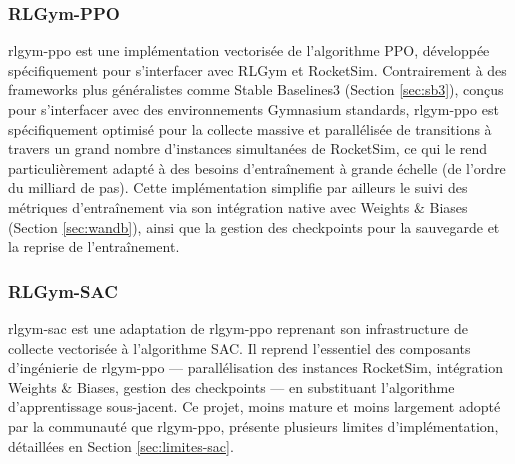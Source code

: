\subsubsection{RLGym-PPO}
\label{sec:rlgym-ppo}
rlgym-ppo est une implémentation vectorisée de l'algorithme PPO, développée spécifiquement pour s'interfacer avec RLGym et RocketSim. Contrairement à des frameworks plus généralistes comme Stable Baselines3 (Section \ref{sec:sb3}), conçus pour s'interfacer avec des environnements Gymnasium standards, rlgym-ppo est spécifiquement optimisé pour la collecte massive et parallélisée de transitions à travers un grand nombre d'instances simultanées de RocketSim, ce qui le rend particulièrement adapté à des besoins d'entraînement à grande échelle (de l'ordre du milliard de pas). Cette implémentation simplifie par ailleurs le suivi des métriques d'entraînement via son intégration native avec Weights \& Biases (Section \ref{sec:wandb}), ainsi que la gestion des checkpoints pour la sauvegarde et la reprise de l'entraînement.
\parencite{allenAechProRlgymppo2026}

\subsubsection{RLGym-SAC}
\label{sec:rlgym-sac}
rlgym-sac est une adaptation de rlgym-ppo reprenant son infrastructure de collecte vectorisée à l'algorithme SAC. Il reprend l'essentiel des composants d'ingénierie de rlgym-ppo — parallélisation des instances RocketSim, intégration Weights \& Biases, gestion des checkpoints — en substituant l'algorithme d'apprentissage sous-jacent. Ce projet, moins mature et moins largement adopté par la communauté que rlgym-ppo, présente plusieurs limites d'implémentation, détaillées en Section \ref{sec:limites-sac}.
\parencite{mcswainUSARedDragonRlgymsac2026}

